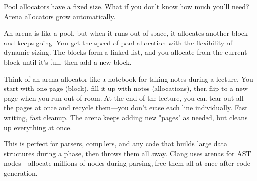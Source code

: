 Pool allocators have a fixed size. What if you don't know how much you'll need? Arena allocators grow automatically.

An arena is like a pool, but when it runs out of space, it allocates another block and keeps going. You get the speed of pool allocation with the flexibility of dynamic sizing. The blocks form a linked list, and you allocate from the current block until it's full, then add a new block.

Think of an arena allocator like a notebook for taking notes during a lecture. You start with one page (block), fill it up with notes (allocations), then flip to a new page when you run out of room. At the end of the lecture, you can tear out all the pages at once and recycle them—you don't erase each line individually. Fast writing, fast cleanup. The arena keeps adding new "pages" as needed, but cleans up everything at once.

This is perfect for parsers, compilers, and any code that builds large data structures during a phase, then throws them all away. Clang uses arenas for AST nodes—allocate millions of nodes during parsing, free them all at once after code generation.

